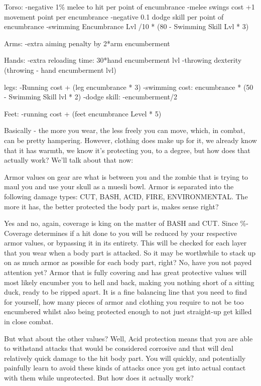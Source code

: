 \documentclass[11pt]{report}
\begin{document}
Torso:
-negative 1\% melee to hit per point of encumbrance
-melee swings cost +1 movement point per encumbrance
-negative 0.1 dodge skill per point of encumbrance
-swimming Encumbrance Lvl /10 * (80 - Swimming Skill Lvl * 3)

Arms:
-extra aiming penalty by 2*arm encumberment

Hands:
-extra reloading time: 30*hand encumberment lvl
-throwing dexterity (throwing - hand encumberment lvl)

legs:
-Running cost + (leg encumbrance * 3)
-swimming cost: encumbrance * (50 - Swimming Skill lvl * 2)
-dodge skill: -encumberment/2

Feet:
-running cost + (feet encumbrance Level * 5)

Basically - the more you wear, the less freely you can move, which, in combat, can be pretty hampering. However, clothing does make up for it, we already know that it has warmth, we know it's protecting you, to a degree, but how does that actually work? We'll talk about that now:

Armor values on gear are what is between you and the zombie that is trying to maul you and use your skull as a muesli bowl. Armor is separated into the following damage types: CUT, BASH, ACID, FIRE, ENVIRONMENTAL. The more it has, the better protected the body part is, makes sense right?

Yes and no, again, coverage is king on the matter of BASH and CUT. Since \%-Coverage determines if a hit done to you will be reduced by your respective armor values, or bypassing it in its entirety. This will be checked for each layer that you wear when a body part is attacked. So it may be worthwhile to stack up on as much armor as possible for each body part, right? No, have you not payed attention yet? Armor that is fully covering and has great protective values will most likely encumber you to hell and back, making you nothing short of a sitting duck, ready to be ripped apart. It is a fine balancing line that you need to find for yourself, how many pieces of armor and clothing you require to not be too encumbered whilst also being protected enough to not just straight-up get killed in close combat.

But what about the other values? Well, Acid protection means that you are able to withstand attacks that would be considered corrosive and that will deal relatively quick damage to the hit body part. You will quickly, and potentially painfully learn to avoid these kinds of attacks once you get into actual contact with them while unprotected. But how does it actually work?
\end{document}
